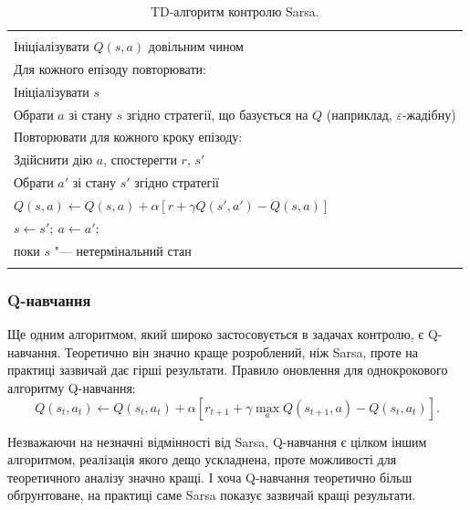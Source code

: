 \begin{table}
\centering
\begin{tabular}{|l|}
\hline\\
Ініціалізувати $Q(s,a)$ довільним чином\\
Для кожного епізоду повторювати:\\
\hspace{0.5cm} Ініціалізувати $s$\\
\hspace{0.5cm} Обрати $a$ зі стану $s$ згідно стратегії, що базується на $Q$ (наприклад, $\varepsilon$-жадібну)\\
\hspace{0.5cm} Повторювати для кожного кроку епізоду:\\
\hspace{1cm} 	Здійснити дію $a$, спостерегти $r$, $s'$\\
\hspace{1cm} 	Обрати $a'$ зі стану $s'$ згідно стратегії\\
\hspace{1cm} 	$Q(s,a) \leftarrow Q(s,a) + \alpha\left[r + \gamma Q(s',a') - Q(s,a)\right]$\\
\hspace{1cm} 	$s \leftarrow s';\ a \leftarrow a';$\\
\hspace{0.5cm} поки $s$ "--- нетермінальний стан\\
\\
\hline
\end{tabular}
\caption{TD-алгоритм контролю Sarsa.}
\label{Sarsa_algorithm}
\end{table}

\subsubsection{Q-навчання}

Ще одним алгоритмом, який широко застосовується в задачах контролю, є Q-навчання. Теоретично він значно краще розроблений, ніж Sarsa, проте на практиці зазвичай дає гірші результати. Правило оновлення для однокрокового алгоритму Q-навчання:
\begin{equation}
Q(s_t,a_t) \leftarrow Q(s_t,a_t) + \alpha\left[r_{t+1} + \gamma \max_a Q(s_{t+1},a) - Q(s_t,a_t)\right].
\end{equation}

Незважаючи на незначні відмінності від Sarsa, Q-навчання є цілком іншим алгоритмом, реалізація якого дещо ускладнена, проте можливості для теоретичного аналізу значно кращі. І хоча Q-навчання теоретично більш обґрунтоване, на практиці саме Sarsa показує зазвичай кращі результати.

